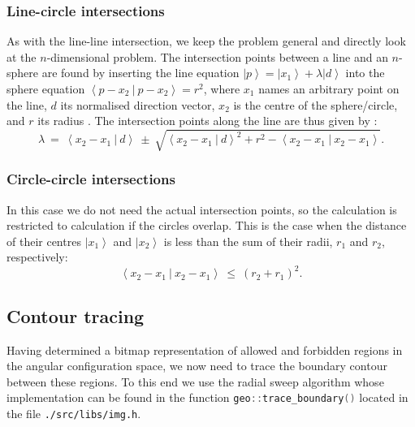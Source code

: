 \subsubsection*{Line-circle intersections}
As with the line-line intersection, we keep the problem general and directly look at the $n$-dimensional problem.
The intersection points between a line and an $n$-sphere are found by inserting the line equation 
$\left|p\right> = \left|x_1\right> + \lambda \left|d\right>$ into the sphere equation 
$\left< p-x_2 \ |\  p-x_2 \right> = r^2$, where $x_1$ names an arbitrary point on the line, $d$ its normalised 
direction vector, $x_2$ is the centre of the sphere/circle, and $r$ its radius \cite{wiki_line_sphere_intersection}.
The intersection points along the line are thus given by \cite{wiki_line_sphere_intersection}:
\begin{equation}
	\lambda \ =\ \left< x_2 - x_1 \  |\  d \right>
		\ \pm\ \sqrt{ \left< x_2 - x_1 \  |\  d \right>^2 
			+ r^2 - \left< x_2 - x_1 \ |\  x_2 - x_1 \right>}.
\end{equation}



\subsubsection*{Circle-circle intersections}
In this case we do not need the actual intersection points, so the calculation is restricted to calculation if
the circles overlap. This is the case when the distance of their centres $\left| x_1 \right>$ and $\left| x_2 \right>$ 
is less than the sum of their radii, $r_1$ and $r_2$, respectively:
\begin{equation}
	\left< x_2 - x_1 \ |\ x_2 - x_1  \right> \ \leq \ \left( r_2 + r_1 \right)^2.
\end{equation}



\subsection{Contour tracing}
\label{sec:contourtracing}
Having determined a bitmap representation of allowed and forbidden regions in the angular configuration space,
we now need to trace the boundary contour between these regions.
To this end we use the radial sweep algorithm \cite{web_radial_sweep} whose implementation can be found
in the function \lstinline[language=C++]|geo::trace_boundary()| located in the file \lstinline|./src/libs/img.h|.

